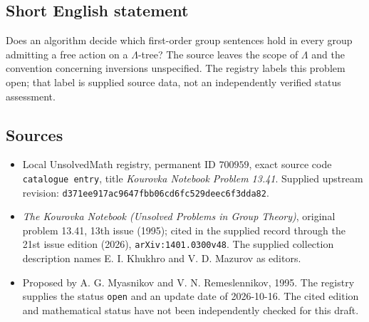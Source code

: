 \documentclass[11pt]{article}
\begin{document}
\subsection{Short English statement}
Does an algorithm decide which first-order group sentences hold in every group admitting a free action on a \(\Lambda\)-tree? The source leaves the scope of \(\Lambda\) and the convention concerning inversions unspecified. The registry labels this problem open; that label is supplied source data, not an independently verified status assessment.
\subsection{Sources}
\begin{itemize}
\item Local UnsolvedMath registry, permanent ID \(700959\), exact source code \texttt{catalogue entry}, title \emph{Kourovka Notebook Problem 13.41}. Supplied upstream revision: \texttt{d371ee917ac9647fbb06cd6fc529deec6f3dda82}.
\item \emph{The Kourovka Notebook (Unsolved Problems in Group Theory)}, original problem 13.41, 13th issue (1995); cited in the supplied record through the 21st issue edition (2026), \texttt{arXiv:1401.0300v48}. The supplied collection description names E. I. Khukhro and V. D. Mazurov as editors.
\item Proposed by A. G. Myasnikov and V. N. Remeslennikov, 1995. The registry supplies the status \texttt{open} and an update date of 2026-10-16. The cited edition and mathematical status have not been independently checked for this draft.
\end{itemize}
\end{document}
